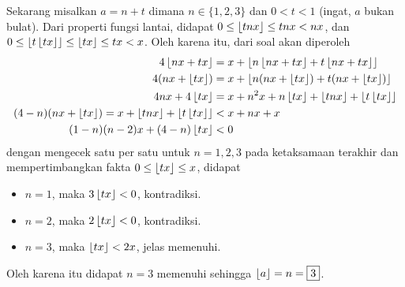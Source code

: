\begin{solusi}
    Sekarang misalkan $a = n + t$ dimana $n \in \{1,2,3\}$ dan $0 < t < 1$ (ingat, $a$ bukan bulat). Dari properti fungsi lantai, didapat $0 \le \left\lfloor tnx \right\rfloor \le tnx < nx$, dan $0 \le \left\lfloor t\left\lfloor tx \right\rfloor \right\rfloor \le \left\lfloor tx \right\rfloor \le tx < x$. Oleh karena itu, dari soal akan diperoleh
    \begin{align*}
        4\left\lfloor nx+tx \right\rfloor &= x + \left\lfloor n\left\lfloor nx+tx \right\rfloor+t\left\lfloor nx+tx \right\rfloor \right\rfloor\\
        4(nx+\left\lfloor tx \right\rfloor) &= x + \left\lfloor n(nx+\left\lfloor tx \right\rfloor)+t(nx+\left\lfloor tx \right\rfloor) \right\rfloor\\
        4nx + 4\left\lfloor tx \right\rfloor &= x + n^2x + n\left\lfloor tx \right\rfloor + \left\lfloor tnx \right\rfloor + \left\lfloor t\left\lfloor tx \right\rfloor \right\rfloor\\
        (4-n)(nx+\left\lfloor tx \right\rfloor) = x + \left\lfloor tnx \right\rfloor + \left\lfloor t\left\lfloor tx \right\rfloor \right\rfloor&<x+nx+x\\
        (1-n)(n-2)x+(4-n)\left\lfloor tx \right\rfloor&<0
    \end{align*}
    dengan mengecek satu per satu untuk $n=1,2,3$ pada ketaksamaan terakhir dan mempertimbangkan fakta $0 \le \left\lfloor tx \right\rfloor \le x$, didapat
    \begin{itemize}
        \item $n=1$, maka $3\left\lfloor tx \right\rfloor < 0$, kontradiksi.
        \item $n=2$, maka $2\left\lfloor tx \right\rfloor < 0$, kontradiksi.
        \item $n=3$, maka $\left\lfloor tx \right\rfloor < 2x$, jelas memenuhi.
    \end{itemize}
    Oleh karena itu didapat $n=3$ memenuhi sehingga $\left\lfloor a \right\rfloor = n = \boxed{3}$.
\end{solusi}